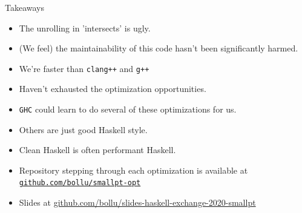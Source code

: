 \documentclass[8pt]{beamer}
\begin{document}
\begin{frame}[fragile]{Takeaways}
\begin{itemize}
\item The unrolling in 'intersects' is ugly.
\item (We feel) the maintainability of this code hasn’t been significantly harmed.
\item We're faster than \texttt{clang++} and \texttt{g++}
\item Haven't exhausted the optimization opportunities.
\item \texttt{GHC} could learn to do several of these optimizations for us.
\item Others are just good Haskell style. 
\item Clean Haskell is often performant Haskell.
\item Repository stepping through each optimization is available at \href{https://github.com/bollu/smallpt-opt}{\texttt{github.com/bollu/smallpt-opt}}
\item Slides at \href{https://github.com/bollu/slides-haskell-exchange-2020-smallpt}{github.com/bollu/slides-haskell-exchange-2020-smallpt}
\end{itemize}

\end{frame}
\end{document}
